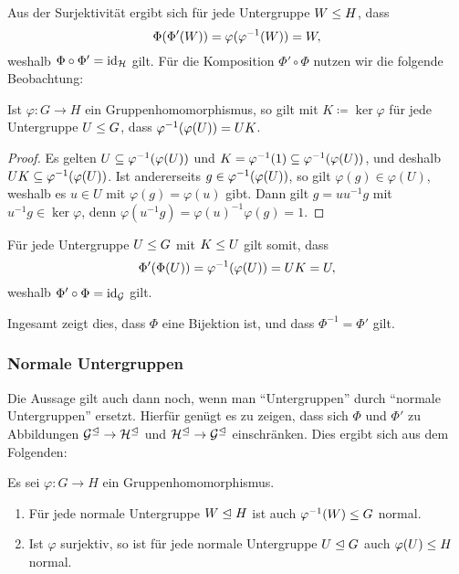 Aus der Surjektivität ergibt sich für jede Untergruppe $W \leq H$, dass
\[
    \Phi(\Phi'(W))
  = \varphi( \varphi^{-1}(W) )
  = W,
\]
weshalb $\Phi \circ \Phi' = \operatorname{id}_{\mathcal{H}}$ gilt.
Für die Komposition $\Phi' \circ \Phi$ nutzen wir die folgende Beobachtung:

\begin{lemma}
  Ist $\varphi \colon G \to H$ ein Gruppenhomomorphismus, so gilt mit $K \coloneqq \ker \varphi$ für jede Untergruppe $U \leq G$, dass $\varphi^{-1}(\varphi(U)) = UK$.
\end{lemma}

\begin{proof}
  Es gelten $U \subseteq \varphi^{-1}(\varphi(U))$ und $K = \varphi^{-1}(1) \subseteq \varphi^{-1}(\varphi(U))$, und deshalb $U K \subseteq \varphi^{-1}(\varphi(U))$.
  Ist andererseits $g \in \varphi^{-1}(\varphi(U))$, so gilt $\varphi(g) \in \varphi(U)$, weshalb es $u \in U$ mit $\varphi(g) = \varphi(u)$ gibt.
  Dann gilt $g = u u^{-1} g$ mit $u^{-1} g \in \ker \varphi$, denn $\varphi(u^{-1} g) = \varphi(u)^{-1} \varphi(g) = 1$.
\end{proof}

Für jede Untergruppe $U \leq G$ mit $K \leq U$ gilt somit, dass
\[
    \Phi'(\Phi(U))
  = \varphi^{-1}(\varphi(U))
  = UK
  = U,
\]
weshalb $\Phi' \circ \Phi = \operatorname{id}_{\mathcal{G}}$ gilt.

Ingesamt zeigt dies, dass $\Phi$ eine Bijektion ist, und dass $\Phi^{-1} = \Phi'$ gilt.





\subsubsection*{Normale Untergruppen}

Die Aussage gilt auch dann noch, wenn man \enquote{Untergruppen} durch \enquote{normale Untergruppen} ersetzt.
Hierfür genügt es zu zeigen, dass sich $\Phi$ und $\Phi'$ zu Abbildungen $\mathcal{G}^\trianglelefteq \to \mathcal{H}^\trianglelefteq$ und $\mathcal{H}^\trianglelefteq \to \mathcal{G}^\trianglelefteq$ einschränken.
Dies ergibt sich aus dem Folgenden:

\begin{lemma}
  Es sei $\varphi \colon G \to H$ ein Gruppenhomomorphismus.
  \begin{enumerate}[label=\arabic*)]
    \item
      Für jede normale Untergruppe $W \trianglelefteq H$ ist auch $\varphi^{-1}(W) \leq G$ normal.
    \item
      Ist $\varphi$ surjektiv, so ist für jede normale Untergruppe $U \trianglelefteq G$ auch $\varphi(U) \leq H$ normal.
  \end{enumerate}
\end{lemma}

